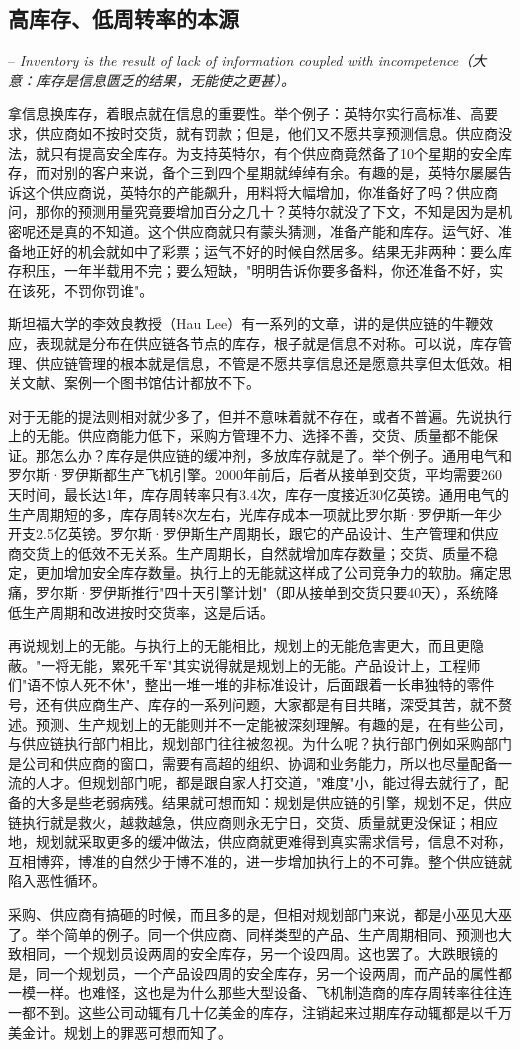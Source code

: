 \subsection { 高库存、低周转率的本源}

    -- \textit{ Inventory is the result of lack of information coupled with incompetence（大意：库存是信息匮乏的结果，无能使之更甚）。}

    拿信息换库存，着眼点就在信息的重要性。举个例子：英特尔实行高标准、高要求，供应商如不按时交货，就有罚款；但是，他们又不愿共享预测信息。供应商没法，就只有提高安全库存。为支持英特尔，有个供应商竟然备了10个星期的安全库存，而对别的客户来说，备个三到四个星期就绰绰有余。有趣的是，英特尔屡屡告诉这个供应商说，英特尔的产能飙升，用料将大幅增加，你准备好了吗？供应商问，那你的预测用量究竟要增加百分之几十？英特尔就没了下文，不知是因为是机密呢还是真的不知道。这个供应商就只有蒙头猜测，准备产能和库存。运气好、准备地正好的机会就如中了彩票；运气不好的时候自然居多。结果无非两种：要么库存积压，一年半载用不完；要么短缺，"明明告诉你要多备料，你还准备不好，实在该死，不罚你罚谁"。

    斯坦福大学的李效良教授（Hau Lee）有一系列的文章，讲的是供应链的牛鞭效应，表现就是分布在供应链各节点的库存，根子就是信息不对称。可以说，库存管理、供应链管理的根本就是信息，不管是不愿共享信息还是愿意共享但太低效。相关文献、案例一个图书馆估计都放不下。

    对于无能的提法则相对就少多了，但并不意味着就不存在，或者不普遍。先说执行上的无能。供应商能力低下，采购方管理不力、选择不善，交货、质量都不能保证。那怎么办？库存是供应链的缓冲剂，多放库存就是了。举个例子。通用电气和罗尔斯·罗伊斯都生产飞机引擎。2000年前后，后者从接单到交货，平均需要260天时间，最长达1年，库存周转率只有3.4次，库存一度接近30亿英镑。通用电气的生产周期短的多，库存周转8次左右，光库存成本一项就比罗尔斯·罗伊斯一年少开支2.5亿英镑。罗尔斯·罗伊斯生产周期长，跟它的产品设计、生产管理和供应商交货上的低效不无关系。生产周期长，自然就增加库存数量；交货、质量不稳定，更加增加安全库存数量。执行上的无能就这样成了公司竞争力的软肋。痛定思痛，罗尔斯·罗伊斯推行"四十天引擎计划"（即从接单到交货只要40天），系统降低生产周期和改进按时交货率，这是后话。

    再说规划上的无能。与执行上的无能相比，规划上的无能危害更大，而且更隐蔽。"一将无能，累死千军"其实说得就是规划上的无能。产品设计上，工程师们"语不惊人死不休"，整出一堆一堆的非标准设计，后面跟着一长串独特的零件号，还有供应商生产、库存的一系列问题，大家都是有目共睹，深受其苦，就不赘述。预测、生产规划上的无能则并不一定能被深刻理解。有趣的是，在有些公司，与供应链执行部门相比，规划部门往往被忽视。为什么呢？执行部门例如采购部门是公司和供应商的窗口，需要有高超的组织、协调和业务能力，所以也尽量配备一流的人才。但规划部门呢，都是跟自家人打交道，"难度"小，能过得去就行了，配备的大多是些老弱病残。结果就可想而知：规划是供应链的引擎，规划不足，供应链执行就是救火，越救越急，供应商则永无宁日，交货、质量就更没保证；相应地，规划就采取更多的缓冲做法，供应商就更难得到真实需求信号，信息不对称，互相博弈，博准的自然少于博不准的，进一步增加执行上的不可靠。整个供应链就陷入恶性循环。

    采购、供应商有搞砸的时候，而且多的是，但相对规划部门来说，都是小巫见大巫了。举个简单的例子。同一个供应商、同样类型的产品、生产周期相同、预测也大致相同，一个规划员设两周的安全库存，另一个设四周。这也罢了。大跌眼镜的是，同一个规划员，一个产品设四周的安全库存，另一个设两周，而产品的属性都一模一样。也难怪，这也是为什么那些大型设备、飞机制造商的库存周转率往往连一都不到。这些公司动辄有几十亿美金的库存，注销起来过期库存动辄都是以千万美金计。规划上的罪恶可想而知了。
